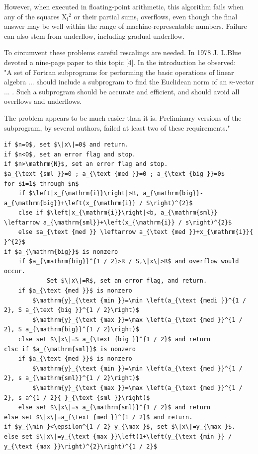 \documentclass[10pt]{article}
\begin{document}
However, when executed in floating-point arithmetic, this algorithm fails when any of the squares $\mathrm{X}_{\mathrm{i}}{ }^{2}$ or their partial sums, overflows, even though the final answer may be well within the range of machine-representable numbers. Failure can also stem from underflow, including gradual underflow.

To circumvent these problems careful rescalings are needed. In 1978 J. L.Blue devoted a nine-page paper to this topic [4]. In the introduction he observed:\\
"A set of Fortran subprograms for performing the basic operations of linear algebra ... should include a subprogram to find the Euclidean norm of an $n$-vector ... . Such a subprogram should be accurate and efficient, and should avoid all overflows and underflows.

The problem appears to be much easier than it is. Preliminary versions of the subprogram, by several authors, failed at least two of these requirements."

\begin{verbatim}
if $n=0$, set $\|x\|=0$ and return.
if $n<0$, set an error flag and stop.
if $n>\mathrm{N}$, set an error flag and stop.
$a_{\text {sml }}=0 ; a_{\text {med }}=0 ; a_{\text {big }}=0$
for $i=1$ through $n$
    if $\left|x_{\mathrm{i}}\right|>B, a_{\mathrm{big}}-a_{\mathrm{big}}+\left(x_{\mathrm{i}} / S\right)^{2}$
    clse if $\left|x_{\mathrm{i}}\right|<b, a_{\mathrm{sml}} \leftarrow a_{\mathrm{sml}}+\left(x_{\mathrm{i}} / s\right)^{2}$
    else $a_{\text {med }} \leftarrow a_{\text {med }}+x_{\mathrm{i}}{ }^{2}$
if $a_{\mathrm{big}}$ is nonzero
    if $a_{\mathrm{big}}^{1 / 2}>R / S,\|x\|>R$ and overflow would occur.
            Set $\|x\|=R$, set an error flag, and return.
    if $a_{\text {med }}$ is nonzero
        $\mathrm{y}_{\text {min }}=\min \left(a_{\text {medi }}^{1 / 2}, S a_{\text {big }}^{1 / 2}\right)$
        $\mathrm{y}_{\text {max }}=\max \left(a_{\text {med }}^{1 / 2}, S a_{\mathrm{big}}^{1 / 2}\right)$
    clse set $\|x\|=S a_{\text {big }}^{1 / 2}$ and return
clsc if $a_{\mathrm{sml}}$ is nonzero
    if $a_{\text {med }}$ is nonzero
        $\mathrm{y}_{\text {min }}=\min \left(a_{\text {med }}^{1 / 2}, s a_{\mathrm{sml}}^{1 / 2}\right)$
        $\mathrm{y}_{\text {max }}=\max \left(a_{\text {med }}^{1 / 2}, s a^{1 / 2}{ }_{\text {sml }}\right)$
    else set $\|x\|=s a_{\mathrm{sml}}^{1 / 2}$ and return
else set $\|x\|=a_{\text {med }}^{1 / 2}$ and return.
if $y_{\min }<\epsilon^{1 / 2} y_{\max }$, set $\|x\|=y_{\max }$.
else set $\|x\|=y_{\text {max }}\left(1+\left(y_{\text {min }} / y_{\text {max }}\right)^{2}\right)^{1 / 2}$
\end{verbatim}
\end{document}
